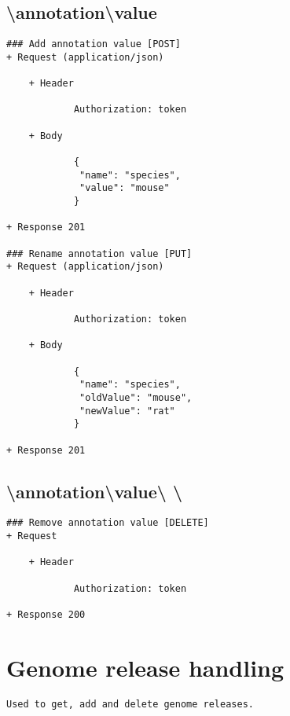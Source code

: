 \subsection*{\textbackslash annotation\textbackslash value}
\begin{verbatim}
### Add annotation value [POST]
+ Request (application/json)

    + Header
    
            Authorization: token
            
    + Body
    
            {
             "name": "species",
             "value": "mouse"
            }

+ Response 201

### Rename annotation value [PUT]
+ Request (application/json)

    + Header
    
            Authorization: token
            
    + Body
    
            {
             "name": "species",
             "oldValue": "mouse",
             "newValue": "rat"
            }

+ Response 201
\end{verbatim}
\subsection*{\textbackslash annotation\textbackslash value\textbackslash <field-name> \textbackslash <value-name>}
\begin{verbatim}
### Remove annotation value [DELETE]
+ Request

    + Header 
        
            Authorization: token

+ Response 200
\end{verbatim}

\section*{Genome release handling}
\begin{verbatim}
Used to get, add and delete genome releases.
\end{verbatim}
